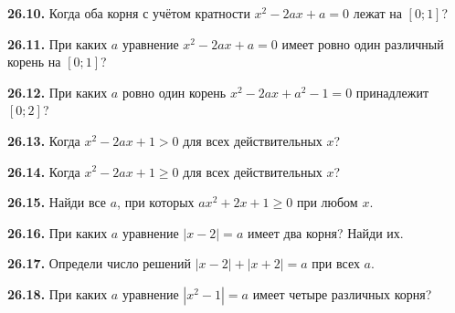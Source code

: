 \noindent\begin{minipage}[t]{\linewidth}\textbf{26.10.}\starmark{} Когда оба корня с учётом кратности \(x^2-2ax+a=0\) лежат на \([0;1]\)?\par\end{minipage}\par
\noindent\begin{minipage}[t]{\linewidth}\textbf{26.11.}\starmark{} При каких \(a\) уравнение \(x^2-2ax+a=0\) имеет ровно один различный корень на \([0;1]\)?\par\end{minipage}\par
\noindent\begin{minipage}[t]{\linewidth}\textbf{26.12.}\starmark{} При каких \(a\) ровно один корень \(x^2-2ax+a^2-1=0\) принадлежит \([0;2]\)?\par\end{minipage}\par
\noindent\begin{minipage}[t]{\linewidth}\textbf{26.13.} Когда \(x^2-2ax+1>0\) для всех действительных \(x\)?\par\end{minipage}\par
\noindent\begin{minipage}[t]{\linewidth}\textbf{26.14.} Когда \(x^2-2ax+1\geq0\) для всех действительных \(x\)?\par\end{minipage}\par
\noindent\begin{minipage}[t]{\linewidth}\textbf{26.15.}\starmark{} Найди все \(a\), при которых \(ax^2+2x+1\geq0\) при любом \(x\).\par\end{minipage}\par
\noindent\begin{minipage}[t]{\linewidth}\textbf{26.16.} При каких \(a\) уравнение \(|x-2|=a\) имеет два корня? Найди их.\par\end{minipage}\par
\noindent\begin{minipage}[t]{\linewidth}\textbf{26.17.}\starmark{} Определи число решений \(|x-2|+|x+2|=a\) при всех \(a\).\par\end{minipage}\par
\noindent\begin{minipage}[t]{\linewidth}\textbf{26.18.}\starmark{} При каких \(a\) уравнение \(|x^2-1|=a\) имеет четыре различных корня?\par\end{minipage}\par

